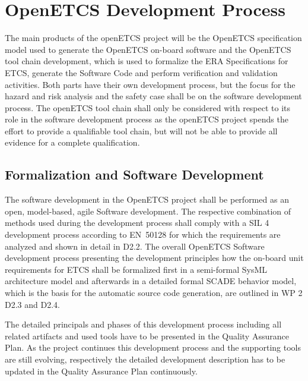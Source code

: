 \documentclass{template/openetcs_report}
\begin{document}




\chapter{OpenETCS Development Process}
\label{sec:development-process}

The main products of the openETCS project will be the OpenETCS specification model used to generate the OpenETCS on-board software and the OpenETCS tool chain development, which is used to formalize the ERA Specifications for ETCS, generate the Software Code and perform verification and validation activities. Both parts have their own development process, but the focus for the hazard and risk analysis and the safety case shall be on the software development process. The openETCS tool chain shall only be considered with respect to its role in the software development process as the openETCS project spends the effort to provide a qualifiable tool chain, but will not be able to provide all evidence for a complete qualification.

\section{Formalization and Software Development}

The software development in the OpenETCS project shall be performed as an open, model-based, agile Software development. The respective combination of methods used during the development process shall comply with a SIL 4 development process according to EN~50128 for which the requirements are analyzed and shown in detail in D2.2. The overall OpenETCS Software development process presenting the development principles how the on-board unit requirements for ETCS shall be formalized first in a semi-formal SysML architecture model and afterwards in a detailed formal SCADE behavior model, which is the basis for the automatic source code generation, are outlined in WP 2 D2.3 and D2.4. 

The detailed principals and phases of this development process including all related artifacts and used tools have to be presented in the Quality Assurance Plan.  As the project continues this development process and the supporting tools are still evolving, respectively the detailed development description has to be updated in the Quality Assurance Plan continuously.
\end{document}
